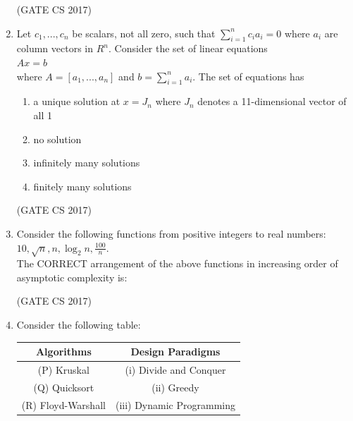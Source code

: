 \documentclass[a4paper, 11pt]{article}
\begin{document}
\begin{enumerate}
    \hfill (GATE CS 2017)
    
    \item Let $c_{1},...,c_{n}$ be scalars, not all zero, such that $\sum_{i=1}^{n}c_{i}a_{i}=0$ where $a_{i}$ are column vectors in $R^{n}$. Consider the set of linear equations \\$Ax=b$ \\where $A=[a_{1},...,a_{n}]$ and $b=\sum_{i=1}^{n}a_{i}$. The set of equations has
    
    \begin{enumerate}
        \item a unique solution at $x=J_{n}$ where $J_{n}$ denotes a 11-dimensional vector of all 1
        \item no solution
        \item infinitely many solutions
        \item finitely many solutions
    \end{enumerate}
    
    \hfill (GATE CS 2017)
    
    \item Consider the following functions from positive integers to real numbers:\\ $10, \sqrt{n}, n, \log_{2}n, \frac{100}{n}$.\\ The CORRECT arrangement of the above functions in increasing order of asymptotic complexity is:
    
    \begin{enumerate}
    \end{enumerate}
    
    \hfill (GATE CS 2017)
    
    \item Consider the following table:
    
    \begin{tabular}{|c|c|}
        \hline
        \textbf{Algorithms} & \textbf{Design Paradigms} \\
        \hline
        (P) Kruskal & (i) Divide and Conquer \\
        (Q) Quicksort & (ii) Greedy \\
        (R) Floyd-Warshall & (iii) Dynamic Programming \\
        \hline
    \end{tabular}
    

\end{enumerate}
\end{document}
